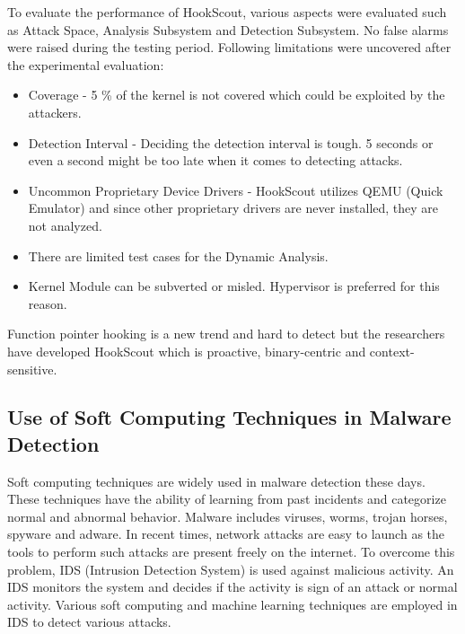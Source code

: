 \documentclass[11pt]{article}
\begin{document}
	To evaluate the performance of HookScout, various aspects were evaluated such as Attack Space, Analysis Subsystem and Detection Subsystem. No false alarms were raised during the testing period. Following limitations were uncovered after the experimental evaluation:
	\begin{itemize}
		\item Coverage - 5 \% of the kernel is not covered which could be exploited by the attackers.
		\item Detection Interval - Deciding the detection interval is tough. 5 seconds or even a second might be too late when it comes to detecting attacks.
		\item Uncommon Proprietary Device Drivers - HookScout utilizes QEMU (Quick Emulator) and since other proprietary drivers are never installed, they are not analyzed.
		\item There are limited test cases for the Dynamic Analysis.
		\item Kernel Module can be subverted or misled. Hypervisor is preferred for this reason.
	\end{itemize}
	Function pointer hooking is a new trend and hard to detect but the researchers have developed HookScout which is proactive, binary-centric and context-sensitive.
	
	\subsection{Use of Soft Computing Techniques in Malware Detection}	
	
	Soft computing techniques are widely used in malware detection these days. These techniques have the ability of learning from past incidents and categorize normal and abnormal behavior. Malware includes viruses, worms, trojan horses, spyware and adware. In recent times, network attacks are easy to launch as the tools to perform such attacks are present freely on the internet. To overcome this problem, IDS (Intrusion Detection System) is used against malicious activity. An IDS monitors the system and decides if the activity is sign of an attack or normal activity. Various soft computing and machine learning techniques are employed in IDS to detect various attacks. 
	
\end{document}

